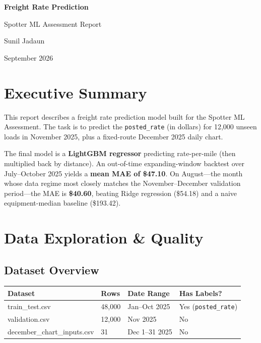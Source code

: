 \documentclass[11pt,a4paper]{article}
\begin{document}
\begin{titlepage}
\centering
\vspace*{5cm}
{\Huge\bfseries\color{spotter} Freight Rate Prediction\par}
\vspace{0.6cm}
{\Large Spotter ML Assessment Report\par}
\vspace{2cm}
{\large Sunil Jadaun\par}
{\large September 2026\par}
\end{titlepage}

\section{Executive Summary}

This report describes a freight rate prediction model built for the Spotter ML Assessment.
The task is to predict the \texttt{posted\_rate} (in dollars) for 12,000 unseen loads in November 2025,
plus a fixed-route December 2025 daily chart.

The final model is a \textbf{LightGBM regressor} predicting rate-per-mile (then multiplied back by distance).
An out-of-time expanding-window backtest over July--October 2025 yields a \textbf{mean MAE of \$47.10}.
On August---the month whose data regime most closely matches the November--December validation period---the MAE is \textbf{\$40.60}, beating Ridge regression (\$54.18) and a naive equipment-median baseline (\$193.42).

\section{Data Exploration \& Quality}

\subsection{Dataset Overview}

\begin{table}[h]
\centering
\begin{tabular}{llll}
\toprule
\textbf{Dataset} & \textbf{Rows} & \textbf{Date Range} & \textbf{Has Labels?} \\
\midrule
train\_test.csv   & 48,000 & Jan--Oct 2025  & Yes (\texttt{posted\_rate}) \\
validation.csv    & 12,000 & Nov 2025       & No \\
december\_chart\_inputs.csv & 31 & Dec 1--31 2025 & No \\
\bottomrule
\end{tabular}
\end{table}
\end{document}
